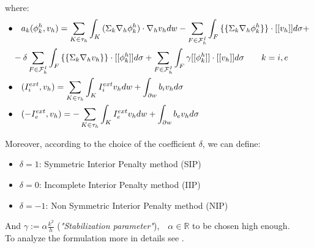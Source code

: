 \documentclass[a4paper,11pt]{article}
\begin{document}
    \vspace{5mm}
    where:
    \vspace{3mm}
    \begin{equation*}
    \begin{aligned}
    \bullet& \quad a_k(\phi_k^h,v_h)=\sum_{K \in \tau_h} \int_K{(\Sigma_k \nabla_h \phi_k^h) \cdot \nabla_h v_h dw}-\sum_{F \in \mathcal{F}_h^I} \int_F { \{\{\Sigma_k \nabla_h \phi_k^h \}\} \cdot [[v_h]] d\sigma}+\\
    &-\delta \sum_{F \in \mathcal{F}_h^I} \int_F{ \{\{\Sigma_k \nabla_h v_h\}\} \cdot [[\phi_k^h]]d\sigma}+\sum_{F \in \mathcal{F}_h^I}\int_F {\gamma [[\phi_k^h]] \cdot [[v_h]] d\sigma} \qquad k=i,e\\
    \newline
    \bullet& \quad (I_i^{ext},v_h)=\sum_{K \in \tau_h} \int_K {I_i^{ext} v_h dw}+\int_{\partial w}{b_i v_h d\sigma}\\
    \newline
    \bullet& \quad (-I_e^{ext},v_h)=-\sum_{K \in \tau_h} \int_K {I_e^{ext} v_h dw}+\int_{\partial w}{b_e v_h d\sigma}
    \end{aligned}
    \end{equation*}
    
    \noindent Moreover, according to the choice of the coefficient $\delta$, we can define:
    \begin{itemize}
    \item $\delta=1$: Symmetric Interior Penalty method (SIP)
    \item $\delta=0$: Incomplete Interior Penalty method (IIP)
    \item $\delta=-1$: Non Symmetric Interior Penalty method (NIP) 
    \end{itemize}
     \vspace{2mm}
    \noindent And $\gamma := \alpha \frac{k^2}{h}$ (\emph{"Stabilization parameter"}),$ \quad \alpha \in \mathbb{R}$ to be chosen high enough. \\
    
    \noindent To analyze the formulation more in details see \cite{marta}.
    \vspace{4mm}
\end{document}
